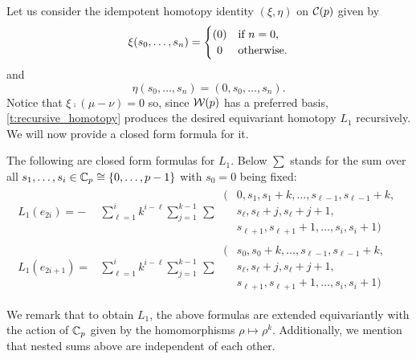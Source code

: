 Let us consider the idempotent homotopy identity $(\xi,\eta)$ on $\mathcal{C}(p)$ given by
\[
\xi({s_0},\dots,{s_n}) =
\begin{cases}
	(0) & \text{if } n = 0, \\
	\hfil0 & \text{otherwise}.
\end{cases}
\]
and
\[
\eta({s_0},\dots,{s_n}) = (0,{s_0},\dots,{s_n}).
\]
Notice that $\xi \comp (\mu - \nu) = 0$ so, since $\mathcal{W}(p)$ has a preferred basis, \cref{t:recursive_homotopy} produces the desired equivariant homotopy $L_1$ recursively.
We will now provide a closed form formula for it.

\begin{lemma*}
	The following are closed form formulas for $L_1$.
	Below $\sum$ stands for the sum over all $s_1,\dots,s_i \in \mathbb{C}_p \cong \{0,\dots,p-1\}$ with $s_0 = 0$ being fixed:
	\begin{align*}
		L_1(e_{2i}) =
		- &\sum_{\ell = 1}^i k^{i-\ell} \sum_{j=1}^{k-1} \, \sum \
		\begin{aligned}
			\big(&0,s_1,s_1+k,\ldots,s_{\ell-1},s_{\ell-1}+k, \\
			&s_{\ell},s_{\ell}+j,s_{\ell}+j+1, \\
			&s_{\ell+1},s_{\ell+1}+1,\ldots,s_i,s_i+1\big)
		\end{aligned} \\[5pt]
		L_1(e_{2i+1}) =
		&\sum_{\ell = 1}^i k^{i-\ell} \sum_{j=1}^{k-1} \, \sum \
		\begin{aligned}
			\big(&s_0,s_0+k,\ldots,s_{\ell-1},s_{\ell-1}+k, \\
			&s_{\ell},s_{\ell}+j,s_{\ell}+j+1, \\
			&s_{\ell+1},s_{\ell+1}+1,\ldots,s_i,s_i+1\big)
		\end{aligned}
	\end{align*}
\end{lemma*}

We remark that to obtain $L_1$, the above formulas are extended equivariantly with the action of $\mathbb{C}_p$ given by the homomorphisms $\rho \mapsto \rho^k$.
Additionally, we mention that nested sums above are independent of each other.

